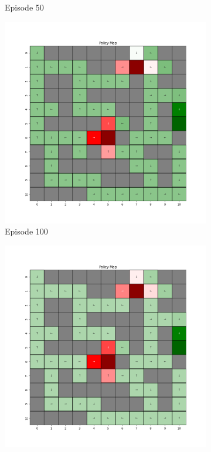 \documentclass{assignment}
\begin{document}
\begin{figure}[H]
\begin{subfigure}{0.3\textwidth}
    \caption{Episode 50}
    \end{subfigure}\hfill
    \begin{subfigure}{0.3\textwidth}
        \includegraphics[width=\textwidth]{figures/policy_td/gamma_sweep/policy_alpha_0.1_gamma_0.1_epsilon_0.2_iteration_100.png}
    \caption{Episode 100}
    \end{subfigure}
    \begin{subfigure}{0.3\textwidth}
        \includegraphics[width=\textwidth]{figures/policy_td/gamma_sweep/policy_alpha_0.1_gamma_0.1_epsilon_0.2_iteration_1000.png}

\end{subfigure}
\end{figure}
\end{document}
